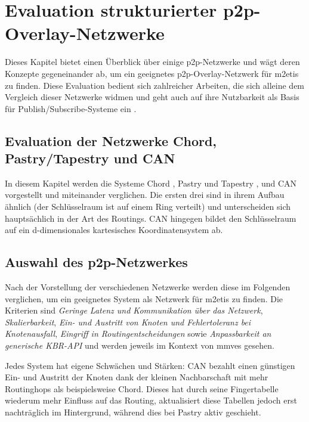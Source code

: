 \chapter{Evaluation strukturierter p2p-Overlay-Netzwerke}
\label{chap:evaluation_p2p}

Dieses Kapitel bietet einen Überblick über einige p2p-Netzwerke und wägt deren Konzepte gegeneinander ab, um ein geeignetes p2p-Overlay-Netzwerk für \ac{m2etis} zu finden. Diese Evaluation bedient sich zahlreicher Arbeiten, die sich alleine dem Vergleich dieser Netzwerke widmen \cite{Lua2005Survey, Goetz2005, Li2004Comparing, Darlagiannis2006Peertopeer, Castro2002Secure, Bo2003PeertoPeer} und geht auch auf ihre Nutzbarkeit als Basis für Publish/Subscribe-Systeme ein \cite{Hosseini2007Survey, Fahmy2007, Castro2003Evaluation, Ratnasamy2001}.

\section[Evaluation dreier p2p-Netzwerke]{Evaluation der Netzwerke Chord, Pastry/Tapestry und CAN}
In diesem Kapitel werden die Systeme Chord \cite{Stoica2003}, Pastry \cite{Rowstron2001} und Tapestry \cite{Zhao2001Tapestry,Zhao2004Tapestry}, und CAN \cite{Ratnasamy2001Scalable} vorgestellt und miteinander verglichen. Die ersten drei sind in ihrem Aufbau ähnlich (der Schlüsselraum ist auf einem Ring verteilt) und unterscheiden sich hauptsächlich in der Art des Routings. CAN hingegen bildet den Schlüsselraum auf ein d-dimensionales kartesisches Koordinatensystem ab. 





\section{Auswahl des p2p-Netzwerkes}
Nach der Vorstellung der verschiedenen Netzwerke werden diese im Folgenden verglichen, um ein geeignetes System als Netzwerk für \ac{m2etis} zu finden. Die Kriterien sind \emph{Geringe Latenz und Kommunikation über das Netzwerk}, \emph{Skalierbarkeit}, \emph{Ein- und Austritt von Knoten und Fehlertoleranz bei Knotenausfall}, \emph{Eingriff in Routingentscheidungen} sowie \emph{Anpassbarkeit an generische KBR-API} und werden jeweils im Kontext von \acp{mmve} gesehen.

Jedes System hat eigene Schwächen und Stärken: CAN bezahlt einen günstigen Ein- und Austritt der Knoten dank der kleinen Nachbarschaft mit mehr Routinghops als beispielsweise Chord. Dieses hat durch seine Fingertabelle wiederum mehr Einfluss auf das Routing, aktualisiert diese Tabellen jedoch erst nachträglich im Hintergrund, während dies bei Pastry aktiv geschieht.

